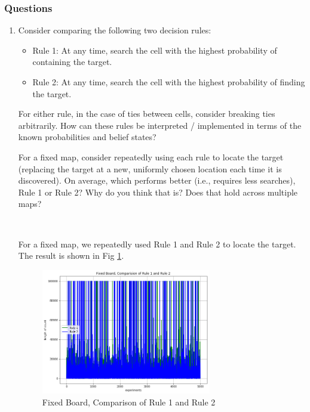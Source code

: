 \documentclass[letter]{article}
\begin{document}
\subsubsection{Questions}
\label{sec:1-2-questions}
\begin{enumerate}
	
	\item {Consider comparing the following two decision rules:
		\begin{itemize}
			\item {Rule 1: At any time, search the cell with the highest probability of containing the target.}
			\item {Rule 2: At any time, search the cell with the highest probability of finding the target.}
		\end{itemize} 
		\par{For either rule, in the case of ties between cells, consider breaking ties arbitrarily. How can these rules be interpreted / implemented in terms of the known probabilities and belief states?}
		\par{For a fixed map, consider repeatedly using each rule to locate the target (replacing the target at a new,
			uniformly chosen location each time it is discovered). On average, which performs better (i.e., requires less
			searches), Rule 1 or Rule 2? Why do you think that is? Does that hold across multiple maps?}
		} \\
	
	\par{For a fixed map, we repeatedly used Rule 1 and Rule 2 to locate the target. The result is shown in Fig \ref{fig:xzc1}.}
	
	\begin{figure}
		\centering
		\includegraphics[width=0.7\textwidth]{fig/xzc1.png}
		\caption{Fixed Board, Comparison of Rule 1 and Rule 2}
		\label{fig:xzc1}
	\end{figure}
	

\end{enumerate}
\end{document}
